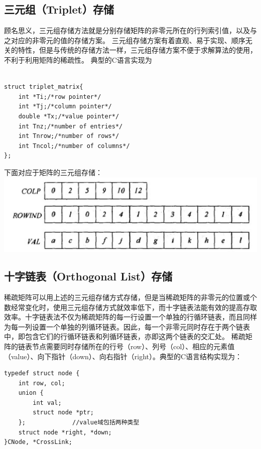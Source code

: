 \subsection{三元组（Triplet）存储}
顾名思义，三元组存储方法就是分别存储矩阵的非零元所在的行列索引值，以及与之对应的非零元的值的存储方案。\cite{fengguangxiang2010.}
\newline
三元组存储方案有着直观、易于实现、顺序无关的特性，但是与传统的存储方法一样，三元组存储方案不便于求解算法的使用，不利于利用矩阵的稀疏性。
典型的C语言实现为\newline
\begin{lstlisting}

struct triplet_matrix{ 
	int *Ti;/*row pointer*/ 
	int *Tj;/*column pointer*/
	double *Tx;/*value pointer*/
	int Tnz;/*number of entries*/
	int Tnrow;/*number of rows*/
	int Tncol;/*number of columns*/
};

\end{lstlisting}
下面对应于矩阵的三元组存储：
\newline\newline\newline\newline\newline
\includegraphics[scale=0.25]{triplet.png}

\subsection{十字链表（Orthogonal List）存储}
稀疏矩阵可以用上述的三元组存储方式存储，但是当稀疏矩阵的非零元的位置或个数经常变化时，使用三元组存储方式就效率低下，而十字链表法能有效的提高存取效率。十字链表法不仅为稀疏矩阵的每一行设置一个单独的行循环链表，而且同样为每一列设置一个单独的列循环链表。因此，每一个非零元同时存在于两个链表中，即包含它们的行循环链表和列循环链表，亦即这两个链表的交汇处。\newline
稀疏矩阵的链表节点需要同时存储所在的行号（row）、列号（col）、相应的元素值（value）、向下指针（down）、向右指针（right）。典型的C语言结构实现为：
\begin{lstlisting}
typedef struct node {
    int row, col;
    union {
        int val;
        struct node *ptr;
    };             //value域包括两种类型
    struct node *right, *down;
}CNode, *CrossLink;
\end{lstlisting}
